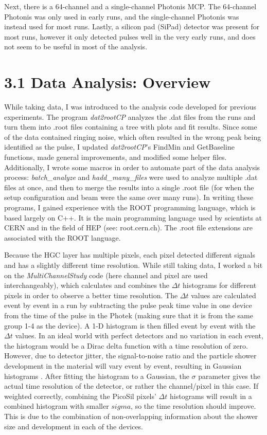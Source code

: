 \documentclass[12pt]{article}
\begin{document}
Next, there is a 64-channel and a single-channel Photonis MCP. The 64-channel Photonis was only used in early runs, and the single-channel Photonis was instead used for most runs. Lastly, a silicon pad (SiPad) detector was present for most runs, however it only detected pulses well in the very early runs, and does not seem to be useful in most of the analysis.

\section*{3.1 Data Analysis: Overview}
While taking data, I was introduced to the analysis code developed for previous experiments. The program \textit{dat2rootCP} analyzes the .dat files from the runs and turn them into .root files containing a tree with plots and fit results. Since some of the data contained ringing noise, which often resulted in the wrong peak being identified as the pulse, I updated \textit{dat2rootCP}’s FindMin and GetBaseline functions, made general improvements, and modified some helper files. Additionally, I wrote some macros in order to automate part of the data analysis process: \textit{batch\_analyze} and \textit{hadd\_many\_files} were used to analyze multiple .dat files at once, and then to merge the results into a single .root file (for when the setup configuration and beam were the same over many runs). In writing these programs, I gained experience with the ROOT programming language, which is based largely on C++. It is the main programming language used by scientists at CERN and in the field of HEP (see: root.cern.ch).  The .root file extensions are associated with the ROOT language.

Because the HGC layer has multiple pixels, each pixel detected different signals and has a slightly different time resolution. While still taking data, I worked a bit on the \textit{MultiChannelStudy} code (here channel and pixel are used interchangeably), which calculates and combines the $\Delta t$ histograms for different pixels in order to observe a better time resolution. The $\Delta t$ values are calculated event by event in a run by subtracting the pulse peak time value in one device from the time of the pulse in the Photek (making sure that it is from the same group 1-4 as the device). A 1-D histogram is then filled event by event with the $\Delta t$ values. In an ideal world with perfect detectors and no variation in each event, the histogram would be a Dirac delta function with a time resolution of zero. However, due to detector jitter, the signal-to-noise ratio and the particle shower development in the material will vary event by event, resulting in Gaussian histograms \cite{P2}. After fitting the histogram to a Gaussian, the $\sigma$ parameter gives the actual time resolution of the detector, or rather the channel/pixel in this case. If weighted correctly, combining the PicoSil pixels’ $\Delta t$ histograms will result in a combined histogram with smaller $sigma$, so the time resolution should improve. This is due to the combination of non-overlapping information about the shower size and development in each of the devices.
\end{document}

